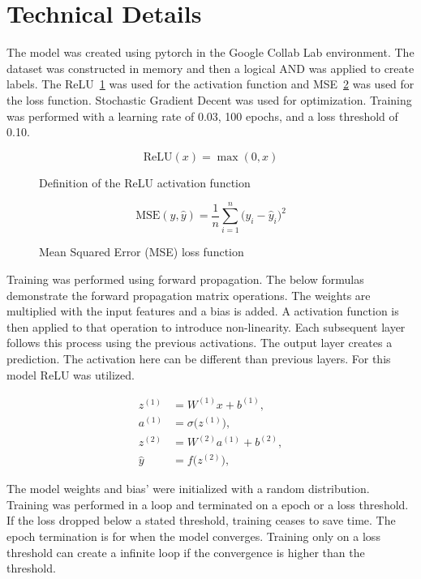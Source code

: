 \section{Technical Details}

The model was created using pytorch in the Google Collab Lab environment. 
The dataset was constructed in memory and then a logical AND was applied to create labels.
The ReLU~\ref{fig:relu-eq} was used for the activation function and MSE~\ref{fig:mse-loss-eq} was used for the loss function.
Stochastic Gradient Decent was used for optimization.
Training was performed with a learning rate of 0.03, 100 epochs, and a loss threshold of 0.10.


\begin{figure}[ht]
  \centering
  \begin{equation}
    \mathrm{ReLU}(x) = \max(0, x)
  \end{equation}
  \caption{Definition of the ReLU activation function}
  \label{fig:relu-eq}
\end{figure}

\begin{figure}[ht]
  \centering
  \begin{equation}
    \mathrm{MSE}(y, \hat{y}) =
    \frac{1}{n} \sum_{i=1}^{n} \bigl(y_i - \hat{y}_i\bigr)^2
  \end{equation}
  \caption{Mean Squared Error (MSE) loss function}
  \label{fig:mse-loss-eq}
\end{figure}

Training was performed using forward propagation. The below formulas demonstrate the forward propagation matrix operations.
The weights are multiplied with the input features and a bias is added. A activation function is then applied to that operation to introduce non-linearity.
Each subsequent layer follows this process using the previous activations.
The output layer creates a prediction. The activation here can be different than previous layers. For this model ReLU was utilized.


\begin{align}
z^{(1)} &= W^{(1)} x + b^{(1)}, \\
a^{(1)} &= \sigma\!\bigl(z^{(1)}\bigr), \\
z^{(2)} &= W^{(2)} a^{(1)} + b^{(2)}, \\
\hat{y} &= f\!\bigl(z^{(2)}\bigr),
\end{align}

The model weights and bias' were initialized with a random distribution. 
Training was performed in a loop and terminated on a epoch or a loss threshold.
If the loss dropped below a stated threshold, training ceases to save time.
The epoch termination is for when the model converges.
Training only on a loss threshold can create a infinite loop if the convergence is higher than the threshold.

